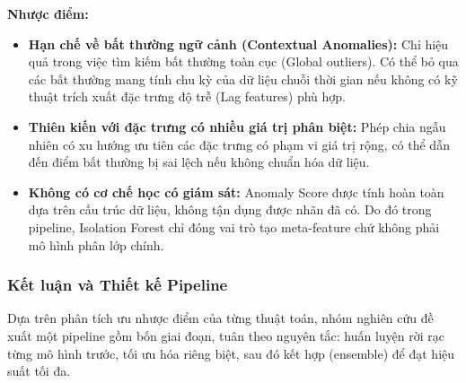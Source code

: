\textbf{Nhược điểm:}
\begin{itemize}
    \item \textbf{Hạn chế về bất thường ngữ cảnh (Contextual Anomalies):} Chỉ hiệu quả trong việc tìm kiếm bất thường toàn cục (Global outliers). Có thể bỏ qua các bất thường mang tính chu kỳ của dữ liệu chuỗi thời gian nếu không có kỹ thuật trích xuất đặc trưng độ trễ (Lag features) phù hợp.
    \item \textbf{Thiên kiến với đặc trưng có nhiều giá trị phân biệt:} Phép chia ngẫu nhiên có xu hướng ưu tiên các đặc trưng có phạm vi giá trị rộng, có thể dẫn đến điểm bất thường bị sai lệch nếu không chuẩn hóa dữ liệu.
    \item \textbf{Không có cơ chế học có giám sát:} Anomaly Score được tính hoàn toàn dựa trên cấu trúc dữ liệu, không tận dụng được nhãn đã có. Do đó trong pipeline, Isolation Forest chỉ đóng vai trò tạo meta-feature chứ không phải mô hình phân lớp chính.
\end{itemize}

\subsubsection{Kết luận và Thiết kế Pipeline}
Dựa trên phân tích ưu nhược điểm của từng thuật toán, nhóm nghiên cứu đề xuất một pipeline gồm bốn giai đoạn, tuân theo nguyên tắc: huấn luyện rời rạc từng mô hình trước, tối ưu hóa riêng biệt, sau đó kết hợp (ensemble) để đạt hiệu suất tối đa.

